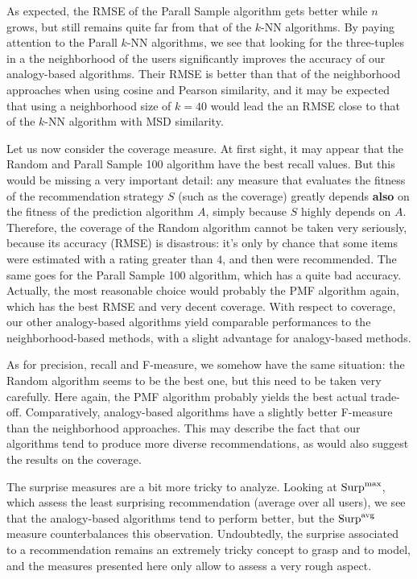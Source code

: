 As expected, the RMSE of the
Parall Sample algorithm gets better while $n$ grows, but still
remains quite far from that of the $k$-NN algorithms. By paying attention to
the Parall $k$-NN algorithms, we see that looking for the
three-tuples in a the neighborhood of the users significantly improves the
accuracy of our analogy-based algorithms. Their RMSE is better than that of the
neighborhood approaches when using cosine and Pearson similarity, and it may
be expected that using a neighborhood size of $k=40$ would lead the an RMSE close
to that of the $k$-NN algorithm with MSD similarity.

Let us now consider the coverage measure. At first sight, it may appear that
the Random and Parall Sample 100 algorithm have the best recall values. But this
would be missing a very important detail: any measure that evaluates the
fitness of the recommendation strategy $S$ (such as the coverage) greatly
depends \textbf{also} on the fitness of the prediction algorithm $A$, simply
because $S$ highly depends on $A$. Therefore, the coverage of the Random
algorithm cannot be taken very seriously, because its accuracy (RMSE) is
disastrous: it's only by chance that some items were estimated with a rating
greater than $4$, and then were recommended. The same goes for the Parall
Sample 100 algorithm, which has a quite bad accuracy.  Actually, the most
reasonable choice would probably the PMF algorithm again, which has the best
RMSE and very decent coverage. With respect to coverage, our other
analogy-based algorithms yield comparable performances to the
neighborhood-based methods, with a slight advantage for analogy-based methods.

As for precision, recall and F-measure, we somehow have the same situation: the
Random algorithm seems to be the best one, but this need to be taken very
carefully. Here again, the PMF algorithm probably yields the best actual trade-off.
Comparatively, analogy-based algorithms have a slightly better F-measure than
the neighborhood approaches. This may describe the fact that our algorithms
tend to produce more diverse recommendations, as would also suggest the results
on the coverage.

The surprise measures are a bit more tricky to analyze. Looking at $\text{Surp}^{\text{max}}$,
which assess the least surprising recommendation (average over all users), we
see that the analogy-based algorithms tend to perform better, but the
$\text{Surp}^{\text{avg}}$ measure counterbalances this observation. Undoubtedly, the surprise
associated to a recommendation remains an extremely tricky concept to grasp and
to model, and the measures presented here only allow to assess a very rough
aspect.

